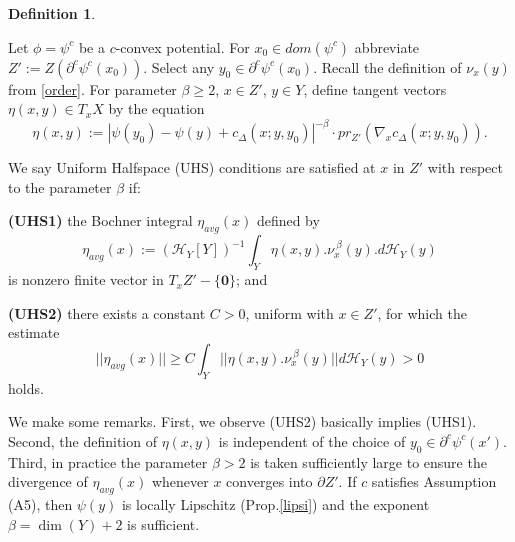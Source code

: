 \documentclass[12pt]{amsart}
\theoremstyle{definition}
\newtheorem{dfn}{Definition}
\theoremstyle{remark}
\newcommand{\del}{\partial}
\newcommand{\sub}{\del^c \psi^c(x')}
\newcommand{\cd}{c_\Delta}
\begin{document}
\begin{dfn}
\label{whs}

Let $\phi=\psi^c$ be a $c$-convex potential. For $x_0\in dom(\psi^c)$ abbreviate $Z':=Z(\del^c \psi^c(x_0))$. Select any $y_0\in \del^c \psi^c(x_0)$. Recall the definition of $\nu_x(y)$ from \ref{order}. For parameter $\beta \geq 2$, $x\in Z'$, $y\in Y$, define tangent vectors $\eta(x,y) \in T_x X$ by the equation \begin{equation}\eta(x, y):=|\psi(y_0)-\psi(y)+\cd(x; y, y_0)|^{-\beta} \cdot pr_{Z'}( \nabla_x \cd(x; y, y_0)). \label{lower0}
\end{equation} 

We say Uniform Halfspace (UHS) conditions are satisfied at $x$ in $Z'$ with respect to the parameter $\beta$ if: 

\textbf{(UHS1)} the Bochner integral $\eta_{avg}(x)$ defined by \begin{equation}\eta_{avg}(x):=(\mathscr{H}_Y[Y])^{-1} \int_{Y} \eta(x,y) . \nu^{~\beta}_x(y) . d\mathscr{H}_Y(y) \label{lowera}
\end{equation} is nonzero finite vector in $T_{x}Z'-\{\textbf{0}\}$; and 

\textbf{(UHS2)} there exists a constant $C>0$, uniform with $x\in Z'$, for which the estimate \begin{equation} 
||\eta_{avg}(x)|| \geq C \int_{Y} ||\eta(x,y) . \nu^{~\beta}_x(y)|| d\mathscr{H}_Y(y) >0 \label{lowerb}
\end{equation} holds.
\end{dfn}

We make some remarks. First, we observe (UHS2) basically implies (UHS1). Second, the definition of $\eta(x,y)$ is independent of the choice of $y_0 \in \sub$. Third, in practice the parameter $\beta>2$ is taken sufficiently large to ensure the divergence of $\eta_{avg}(x)$ whenever $x$ converges into $\del Z'$. If $c$ satisfies Assumption (A5), then $\psi(y)$ is locally Lipschitz (Prop.\ref{lipsi}) and the exponent $\beta=\dim(Y)+2$ is sufficient. %





\end{document}
